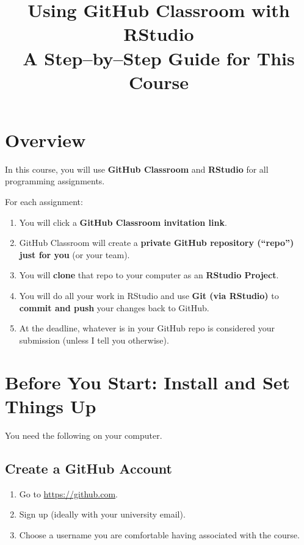 \documentclass[11pt]{scrartcl}
\title{\vspace{-1.5em}Using GitHub Classroom with RStudio\\[0.5em]
  \large A Step--by--Step Guide for This Course}
\author{}
\date{}
\begin{document}
\maketitle
\vspace{-1.5em}

\section{Overview}

In this course, you will use \textbf{GitHub Classroom} and \textbf{RStudio} for all programming assignments.

For each assignment:

\begin{enumerate}[label=\arabic*., nosep]
  \item You will click a \textbf{GitHub Classroom invitation link}.
  \item GitHub Classroom will create a \textbf{private GitHub repository (``repo'') just for you} (or your team).
  \item You will \textbf{clone} that repo to your computer as an \textbf{RStudio Project}.
  \item You will do all your work in RStudio and use \textbf{Git (via RStudio)} to \textbf{commit and push} your changes back to GitHub.
  \item At the deadline, whatever is in your GitHub repo is considered your submission (unless I tell you otherwise).
\end{enumerate}

\section{Before You Start: Install and Set Things Up}

You need the following on your computer.

\subsection{Create a GitHub Account}

\begin{enumerate}[label=\arabic*., nosep]
  \item Go to \url{https://github.com}.
  \item Sign up (ideally with your university email).
  \item Choose a username you are comfortable having associated with the course.
\end{enumerate}
\end{document}
